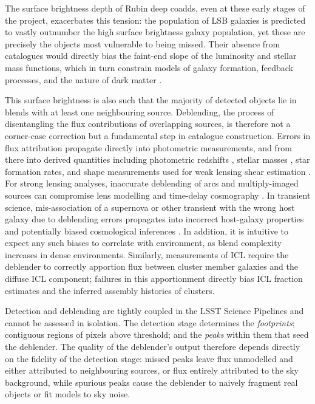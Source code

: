 \documentclass[DM,lsstdraft,authoryear,toc]{lsstdoc}
\begin{document}
The surface brightness depth of Rubin deep coadds, even at these early stages of the project,
exacerbates this tension: the population of LSB galaxies is predicted to
vastly outnumber the high surface brightness galaxy population, yet these are
precisely the objects most vulnerable to being missed. Their absence from
catalogues would directly bias the faint-end slope of the luminosity and
stellar mass functions, which in turn constrain models of galaxy formation,
feedback processes, and the nature of dark matter
\citep[e.g.][]{BullockBoylanKolchin2017}.

This surface brightness is also such
that the majority of detected objects lie in blends with at least one
neighbouring source. Deblending, the process of disentangling the flux
contributions of overlapping sources, is therefore not a corner-case
correction but a fundamental step in catalogue construction. Errors in
flux attribution propagate directly into photometric measurements, and from there
into derived quantities including photometric redshifts
\citep[e.g.][]{Benitez2000}, stellar masses
\citep[e.g.][]{Taylor2011,Bryant2015}, star formation rates, and shape
measurements used for weak lensing shear estimation
\citep[e.g.][]{SheldonHuff2017}. For strong lensing analyses, inaccurate
deblending of arcs and multiply-imaged sources can compromise lens modelling
and time-delay cosmography \citep[e.g.][]{Suyu2017}. In transient science,
mis-association of a supernova or other transient with the wrong host galaxy
due to deblending errors propagates into incorrect host-galaxy properties and
potentially biased cosmological inferences \citep[e.g.][]{Gupta2016,Sako2018}.
In addition, it is intuitive to expect any such biases to correlate with environment,
as blend complexity increases in dense environments. 
Similarly, measurements of ICL require the deblender to correctly apportion flux
between cluster member galaxies and the diffuse ICL component; failures in
this apportionment directly bias ICL fraction estimates and the inferred
assembly histories of clusters.

Detection and deblending are tightly coupled in the LSST Science Pipelines and
cannot be assessed in isolation. The detection stage determines the
\emph{footprints}; contiguous regions of pixels above threshold; and the
\emph{peaks} within them that seed the deblender. The quality of
the deblender's output therefore depends directly on the fidelity of the
detection stage: missed peaks leave flux unmodelled and either attributed to
neighbouring sources, or flux entirely attributed to the sky background, while spurious peaks cause the deblender to naively fragment
real objects or fit models to sky noise.
\end{document}

